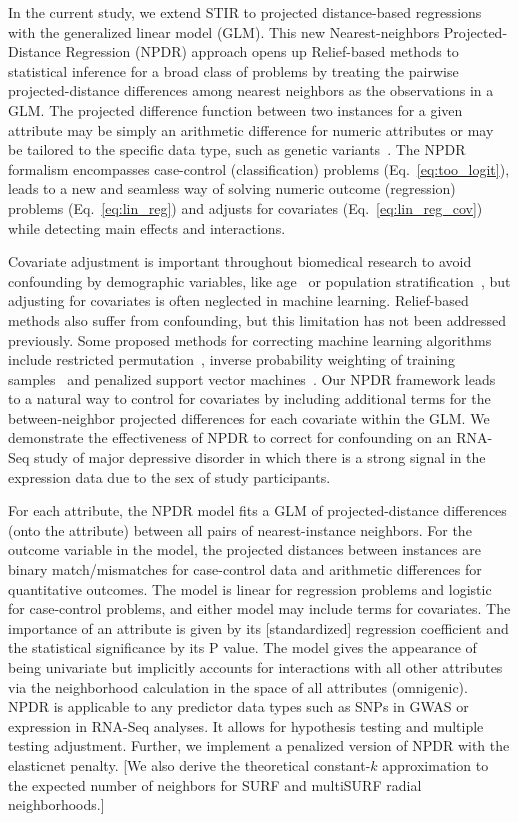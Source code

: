 \documentclass[10pt]{article}
\begin{document}
In the current study, we extend STIR to projected distance-based regressions with the generalized linear model (GLM).
This new Nearest-neighbors Projected-Distance Regression (NPDR) approach opens up Relief-based methods to statistical inference for a broad class of problems by treating the pairwise projected-distance differences among nearest neighbors as the observations in a GLM.
The projected difference function between two instances for a given attribute may be simply an arithmetic difference for numeric attributes or may be tailored to the specific data type, such as genetic variants~\cite{titv}.
The NPDR formalism encompasses case-control (classification) problems (Eq.~\ref{eq:too_logit}), leads to a new and seamless way of solving numeric outcome (regression) problems (Eq.~\ref{eq:lin_reg}) and adjusts for covariates (Eq.~\ref{eq:lin_reg_cov}) while detecting main effects and interactions. 

Covariate adjustment is important throughout biomedical research to avoid confounding by demographic variables, like age~\cite{le18_brainagesim} or population stratification~\cite{popstrat16}, but adjusting for covariates is often neglected in machine learning. Relief-based methods also suffer from confounding, but this limitation has not been addressed previously. Some proposed methods for correcting machine learning algorithms include restricted permutation~\cite{rao2017}, inverse probability weighting of training samples~\cite{linn2016} and penalized support vector machines~\cite{li2011ccsvm}. Our NPDR framework leads to a natural way to control for covariates by including additional terms for the between-neighbor projected differences for each covariate within the GLM. We demonstrate the effectiveness of NPDR to correct for confounding on an RNA-Seq study of major depressive disorder in which there is a strong signal in the expression data due to the sex of study participants. 

For each attribute, the NPDR model fits a GLM of projected-distance differences (onto the attribute) between all pairs of nearest-instance neighbors. For the outcome variable in the model, the projected distances between instances are binary match/mismatches for case-control data and arithmetic differences for quantitative outcomes.
The model is linear for regression problems and logistic for case-control problems, and either model may include terms for covariates. The importance of an attribute is given by its [standardized] regression coefficient and the statistical significance by its P value.
The model gives the appearance of being univariate but implicitly accounts for interactions with all other attributes via the neighborhood calculation in the space of all attributes (omnigenic).
NPDR is applicable to any predictor data types such as SNPs in GWAS or expression in RNA-Seq analyses.
It allows for hypothesis testing and multiple testing adjustment.
Further, we implement a penalized version of NPDR with the elasticnet penalty.
[We also derive the theoretical constant-$k$ approximation to the expected number of neighbors for SURF and multiSURF radial neighborhoods.]
\end{document}
